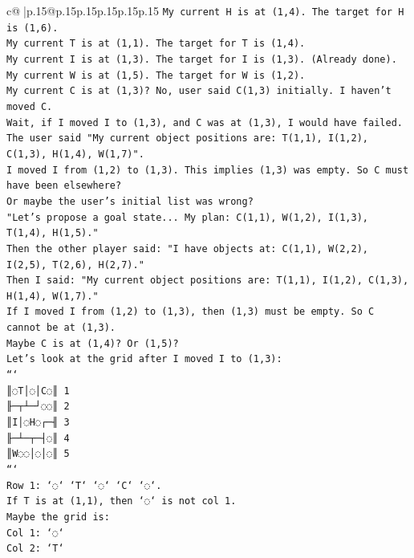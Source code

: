 \documentclass{article}
\begin{document}
{\begin{supertabular}{c@{$\;$}|p{.15\linewidth}@{}p{.15\linewidth}p{.15\linewidth}p{.15\linewidth}p{.15\linewidth}p{.15\linewidth}}
{{{\texttt{My current H is at (1,4). The target for H is (1,6).} \\
\texttt{My current T is at (1,1). The target for T is (1,4).} \\
\texttt{My current I is at (1,3). The target for I is (1,3). (Already done).} \\
\texttt{My current W is at (1,5). The target for W is (1,2).} \\
\texttt{My current C is at (1,3)? No, user said C(1,3) initially. I haven't moved C.} \\
\texttt{Wait, if I moved I to (1,3), and C was at (1,3), I would have failed.} \\
\texttt{The user said "My current object positions are: T(1,1), I(1,2), C(1,3), H(1,4), W(1,7)".} \\
\texttt{I moved I from (1,2) to (1,3). This implies (1,3) was empty. So C must have been elsewhere?} \\
\texttt{Or maybe the user's initial list was wrong?} \\
\texttt{"Let's propose a goal state... My plan: C(1,1), W(1,2), I(1,3), T(1,4), H(1,5)."} \\
\texttt{Then the other player said: "I have objects at: C(1,1), W(2,2), I(2,5), T(2,6), H(2,7)."} \\
\texttt{Then I said: "My current object positions are: T(1,1), I(1,2), C(1,3), H(1,4), W(1,7)."} \\
\texttt{If I moved I from (1,2) to (1,3), then (1,3) must be empty. So C cannot be at (1,3).} \\
\texttt{Maybe C is at (1,4)? Or (1,5)?} \\
\texttt{Let's look at the grid after I moved I to (1,3):} \\
\texttt{```} \\
\texttt{║◌T│◌│C◌║ 1} \\
\texttt{╟─┬┴─┘◌◌║ 2} \\
\texttt{║I│◌H◌┌─╢ 3} \\
\texttt{╟─┴─┬─┤◌║ 4} \\
\texttt{║W◌◌│◌│◌║ 5} \\
\texttt{```} \\
\texttt{Row 1: `◌` `T` `◌` `C` `◌`.} \\
\texttt{If T is at (1,1), then `◌` is not col 1.} \\
\texttt{Maybe the grid is:} \\
\texttt{Col 1: `◌`} \\
\texttt{Col 2: `T`} \\
}}}
\end{supertabular}}
\end{document}
